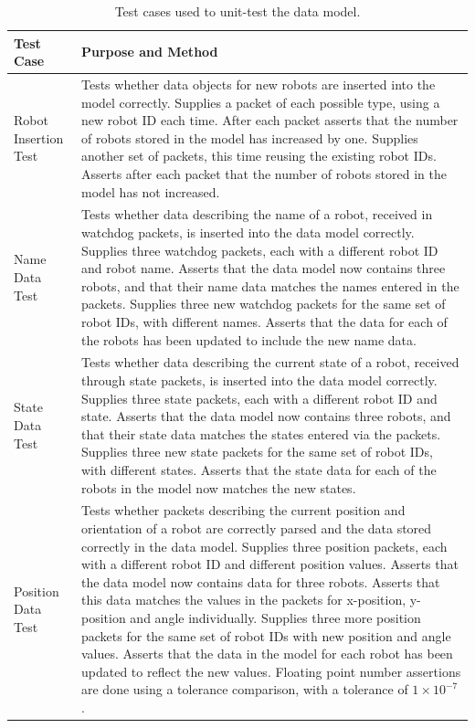 \begin{longtable}{ l p{10cm} }
\caption[Data Model Test Cases]{Test cases used to unit-test the data model.}\\
 Test Case & Purpose and Method\\
 \hline
 Robot Insertion Test & Tests whether data objects for new robots are inserted into the model correctly. Supplies a packet of each possible type, using a new robot ID each time. After each packet asserts that the number of robots stored in the model has increased by one. Supplies another set of packets, this time reusing the existing robot IDs. Asserts after each packet that the number of robots stored in the model has not increased.\\
 Name Data Test & Tests whether data describing the name of a robot, received in watchdog packets, is inserted into the data model correctly. Supplies three watchdog packets, each with a different robot ID and robot name. Asserts that the data model now contains three robots, and that their name data matches the names entered in the packets. Supplies three new watchdog packets for the same set of robot IDs, with different names. Asserts that the data for each of the robots has been updated to include the new name data.\\
 State Data Test & Tests whether data describing the current state of a robot, received through state packets, is inserted into the data model correctly. Supplies three state packets, each with a different robot ID and state. Asserts that the data model now contains three robots, and that their state data matches the states entered via the packets. Supplies three new state packets for the same set of robot IDs, with different states. Asserts that the state data for each of the robots in the model now matches the new states.\\
 Position Data Test & Tests whether packets describing the current position and orientation of a robot are correctly parsed and the data stored correctly in the data model. Supplies three position packets, each with a different robot ID and different position values. Asserts that the data model now contains data for three robots. Asserts that this data matches the values in the packets for x-position, y-position and angle individually. Supplies three more position packets for the same set of robot IDs with new position and angle values. Asserts that the data in the model for each robot has been updated to reflect the new values. Floating point number assertions are done using a tolerance comparison, with a tolerance of $ 1 \times 10^{-7} $.\\

\end{longtable}
